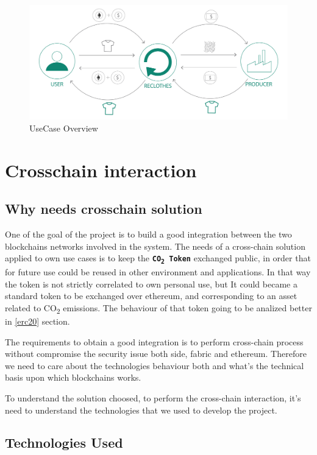 \begin{figure}[h!]
	\centering
	\includegraphics[totalheight=6cm]{img/use-case-schema.png}
	\caption{UseCase Overview}
	\label{fig:schema}
\end{figure}

\clearpage
\section{Crosschain interaction}

\subsection{Why needs crosschain solution}

One of the goal of the project is to build a good integration between the two blockchains networks
involved in the system. The needs of a cross-chain solution applied to own use cases is to 
keep the \textbf{\texttt{CO\textsubscript{2} Token}} exchanged public, in order that for future use could be reused in 
other environment and applications. In that way the token is not strictly correlated to own personal use, but
It could became a standard token to be exchanged over ethereum, and corresponding to an asset
related to CO\textsubscript{2} emissions. The behaviour of that token going to be analized better
in \ref{erc20} section.
\bigskip

The requirements to obtain a good integration is to perform cross-chain
process without compromise the security issue both side, fabric and ethereum. Therefore we 
need to care about the technologies behaviour both and what's the technical basis upon which 
blockchains works. 
\bigskip

To understand the solution choosed, to perform the cross-chain interaction, it's need to understand the 
technologies that we used to develop the project.

\subsection{Technologies Used}

